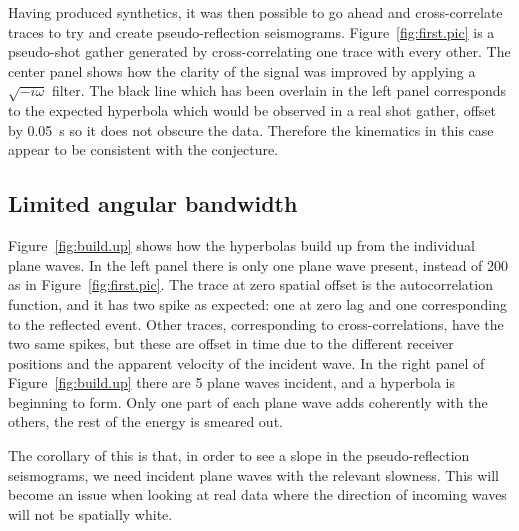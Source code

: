 Having produced synthetics, it was then possible to go ahead and 
cross-correlate traces to try and create pseudo-reflection seismograms. 
Figure~\ref{fig:first.pic} is a pseudo-shot gather generated 
by cross-correlating one trace with every other.  The center panel shows how 
the clarity of the signal 
was improved by applying a $\sqrt{-i\omega}$ filter. 
The black line which has been overlain in the left panel 
corresponds to the expected hyperbola which would be observed in a real
shot gather, offset by 0.05~s so it does not obscure the data.
Therefore the kinematics in this case appear to be consistent 
with the conjecture.


\subsection{Limited angular bandwidth}

Figure~\ref{fig:build.up} shows how the hyperbolas build up 
from the individual plane waves. In the left panel there is only
one plane wave present, instead of 200 as in Figure~\ref{fig:first.pic}.  
The trace at zero spatial offset is the autocorrelation 
function, and it has two spike as expected: 
one at zero lag and one corresponding to the reflected event. 
Other traces, corresponding to cross-correlations, have the two same 
spikes, but these are offset in time due to the different 
receiver positions and the apparent velocity of the incident wave.
In the right panel of Figure~\ref{fig:build.up} there are 5 plane waves incident, 
and a hyperbola is beginning to form.
Only one part of each plane wave adds coherently with the others, the rest 
of the energy is smeared out. 

The corollary of this is that, in order to see a slope in the pseudo-reflection
seismograms, we need incident plane waves with the relevant slowness.
This will become an issue when looking at real data where the direction of
incoming waves will not be spatially white.



